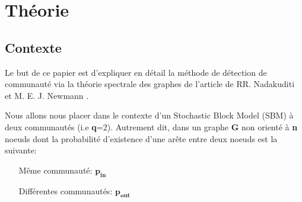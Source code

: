 \section{Théorie}
\subsection{Contexte}
Le but de ce papier est d'expliquer en détail la méthode de détection de communauté via la théorie spectrale des graphes de l'article de RR. Nadakuditi et M. E. J. Newmann .

Nous allons nous placer dans le contexte d'un Stochastic Block Model (SBM) à deux communautés (i.e \textbf{q}=2).
Autrement dit, dans un graphe \textbf{G} non orienté à \textbf{n} noeuds dont la probabilité d'existence d'une arête entre deux noeuds est la suivante:
\begin{itemize}
    \item[Même communauté:] $\mathbf{p_{in}}$  
    \item[Différentes communautés:] $\mathbf{p_{out}}$\\
\end{itemize}

